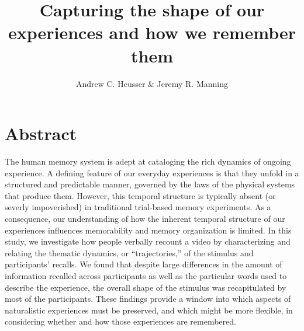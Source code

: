 \documentclass{article}
\title{Capturing the shape of our experiences and how we remember them}
\author{Andrew C. Heusser \& Jeremy R. Manning}
\begin{document}
\maketitle

\section{Abstract}
{
The human memory system is adept at cataloging the rich dynamics of ongoing experience. A defining feature of our everyday experiences is that they unfold in a structured and predictable manner, governed by the laws of the physical systems that produce them. However, this temporal structure is typically absent (or severly impoverished) in traditional trial-based memory experiments. As a consequence, our understanding of how the inherent temporal structure of our experiences influences memorability and memory organization is limited. In this study, we investigate how people verbally recount a video by characterizing and relating the thematic dynamics, or ``trajectories,'' of the stimulus and participants' recalls. We found that despite large differences in the amount of information recalled across participants as well as the particular words used to describe the experience, the overall shape of the stimulus was recapitulated by most of the participants. These findings provide a window into which aspects of naturalistic experiences must be preserved, and which might be more flexible, in considering whether and how those experiences are remembered.


}
\end{document}
